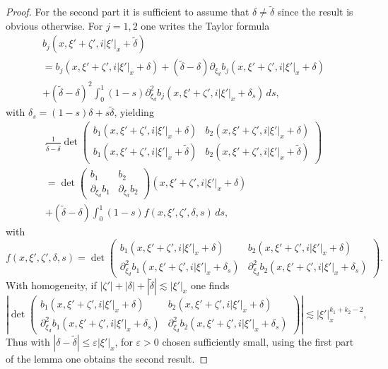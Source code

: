 \documentclass[10pt]{amsart}
\theoremstyle{plain}
\theoremstyle{definition}
\newcommand{\suff}{sufficiently\xspace}
\let\eps\varepsilon
\begin{document}
\begin{proof}
For the second part it is sufficient to assume that
$\delta \neq \tilde{\delta}$ since the result is obvious otherwise.
For $j=1,2$ one writes the Taylor formula
\begin{multline*}
b_j (x,\xi' + \zeta', i |\xi'|_x+ \tilde{\delta})\\
= b_j (x,\xi' + \zeta', i |\xi'|_x+ \delta)
+ (\tilde{\delta} - \delta)
\partial_{\xi_d} b_j (x,\xi' + \zeta', i |\xi'|_x+ \delta)\\
+ (\tilde{\delta} - \delta)^2
\int_0^1 (1- s) \partial_{\xi_d}^2 b_j
(x,\xi' + \zeta', i |\xi'|_x+ \delta_s)
\, ds,
\end{multline*}
with $\delta_s = (1-s)\delta +s \tilde{\delta}$,
yielding
\begin{multline*}
\frac{1}{\tilde{\delta} - \delta}
\det \begin{pmatrix}
b_1 (x,\xi' + \zeta', i |\xi'|_x+ \delta)
&b_2 (x,\xi' + \zeta', i |\xi'|_x+ \delta)\\[
4pt]
b_1 (x,\xi' + \zeta', i |\xi'|_x+ \tilde{\delta})
& b_2 (x,\xi' + \zeta', i |\xi'|_x+ \tilde{\delta})
\end{pmatrix}\\
= \det \begin{pmatrix}
b_1 &b_2 \\[2pt]
\partial_{\xi_d} b_1 &\partial_{\xi_d} b_2
\end{pmatrix}(x,\xi' + \zeta', i |\xi'|_x+ \delta)\\[-5pt]
+
(\tilde{\delta} - \delta) \int_0^1 (1-s)
f(x,\xi', \zeta', \delta, s)\,
d s,
\end{multline*}
with
\begin{equation*}
f(x,\xi', \zeta', \delta, s)= \det \begin{pmatrix}
b_1 (x,\xi' + \zeta', i |\xi'|_x+ \delta)
&b_2 (x,\xi' + \zeta', i |\xi'|_x+ \delta)\\[2pt]
\partial_{\xi_d}^2 b_1 (x,\xi' + \zeta', i |\xi'|_x+\delta_s)
&\partial_{\xi_d}^2 b_2 (x,\xi' + \zeta', i |\xi'|_x+\delta_s)
\end{pmatrix}.
\end{equation*}
With homogeneity, if $|\zeta'| + |\delta| + |\tilde{\delta}| \lesssim |\xi'|_x$ one
finds
\[
\left| \det \begin{pmatrix}
b_1 (x,\xi' + \zeta', i |\xi'|_x+ \delta)
&b_2 (x,\xi' + \zeta', i |\xi'|_x+ \delta)\\[
2pt]
\partial_{\xi_d}^2 b_1 (x,\xi' + \zeta', i |\xi'|_x+\delta_s)
&\partial_{\xi_d}^2 b_2 (x,\xi' + \zeta', i |\xi'|_x+\delta_s)
\end{pmatrix}\right|
\lesssim |\xi'|_x^{k_1 + k_2 -2},
\]
Thus with $|\delta - \tilde{\delta}|\leq \eps |\xi'|_x$, for
$\eps>0$ chosen \suff small, using the first part of the lemma one obtains
the second result.
\end{proof}
\end{document}
